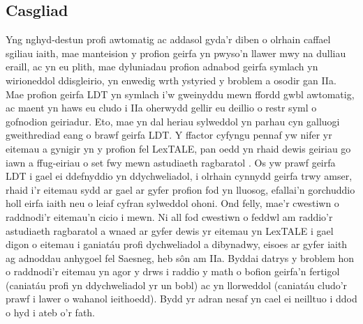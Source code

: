 \subsection{Casgliad}
Yng nghyd-destun profi awtomatig ac addasol gyda'r diben o olrhain caffael sgiliau iaith, mae manteision y profion geirfa yn pwyso'n llawer mwy na dulliau eraill, ac yn eu plith, mae dyluniadau profion adnabod geirfa symlach yn wirioneddol ddisgleirio, yn enwedig wrth ystyried y broblem a osodir gan IIa\@. Mae profion geirfa LDT yn symlach i'w gweinyddu mewn ffordd gwbl awtomatig, ac maent yn haws eu cludo i IIa oherwydd gellir eu deillio o restr syml o gofnodion geiriadur. Eto, mae yn dal heriau sylweddol yn parhau cyn galluogi gweithrediad eang o brawf geirfa LDT\@. Y ffactor cyfyngu pennaf yw nifer yr eitemau a gynigir yn y profion fel LexTALE, pan oedd yn rhaid dewis geiriau go iawn a ffug-eiriau o set fwy mewn astudiaeth ragbaratol \parencite{lemhofer_introducing_2012}. Os yw prawf geirfa LDT i gael ei ddefnyddio yn ddychweliadol, i olrhain cynnydd geirfa trwy amser, rhaid i'r eitemau sydd ar gael ar gyfer profion fod yn lluosog, efallai'n gorchuddio holl eirfa iaith neu o leiaf cyfran sylweddol ohoni. Ond felly, mae'r cwestiwn o raddnodi'r eitemau'n cicio i mewn. Ni all fod cwestiwn o feddwl am raddio'r astudiaeth ragbaratol a wnaed ar gyfer dewis yr eitemau yn LexTALE i gael digon o eitemau i ganiatáu profi dychweliadol a dibynadwy, eisoes ar gyfer iaith ag adnoddau anhygoel fel Saesneg, heb sôn am IIa\@. Byddai datrys y broblem hon o raddnodi'r eitemau yn agor y drws i raddio y math o bofion geirfa'n fertigol (caniatáu profi yn ddychweliadol yr un bobl) ac yn llorweddol (caniatáu cludo'r prawf i lawer o wahanol ieithoedd). Bydd yr adran nesaf yn cael ei neilltuo i ddod o hyd i ateb o'r fath.

